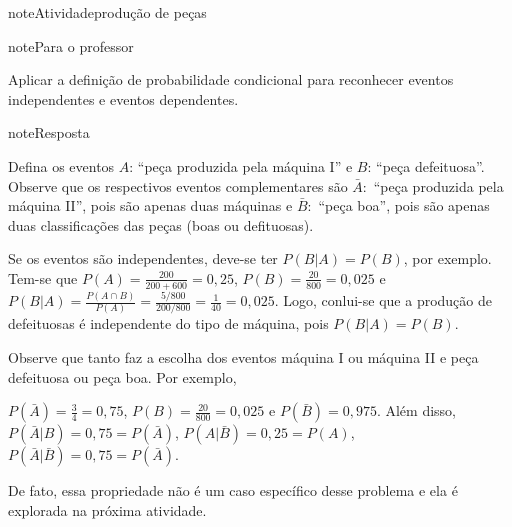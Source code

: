 \begin{sphinxadmonition}{note}{Atividade}{produção de peças}
\label{ativ-producao-de-pecas}

\begin{sphinxadmonition}{note}{Para o professor}

 Aplicar a definição de probabilidade condicional para reconhecer eventos independentes e eventos dependentes.

\begin{sphinxadmonition}{note}{Resposta}

Defina os eventos \(A\):  “peça produzida pela máquina I” e \(B\): “peça defeituosa”. Observe que os respectivos eventos complementares são \(\bar{A}:\) “peça produzida pela máquina II”, pois são apenas duas máquinas e \(\bar{B}:\) “peça boa”, pois são apenas duas classificações das peças (boas ou defituosas).

Se os eventos são independentes, deve-se ter \(P(B|A)=P(B)\), por exemplo. Tem-se que \(P(A)=\frac{200}{200+600}=0,25\), \(P(B)=\frac{20}{800}=0,025\) e \(P(B|A)=\frac{P(A\cap B)}{P(A)}=\frac{5/800}{200/800}=\frac{1}{40}=0,025\). Logo, conlui-se que a produção de defeituosas é independente do tipo de máquina, pois \(P(B|A)=P(B)\).

Observe que tanto faz a escolha dos eventos máquina I ou máquina II e peça defeituosa ou peça boa. Por exemplo,

\(P(\bar{A})=\frac{3}{4}=0,75\), \(P(B)=\frac{20}{800}=0,025\) e \(P(\bar{B})=0,975\).
Além disso, \(P(\bar{A}|B)=0,75=P(\bar{A})\), \(P(A|\bar{B})=0,25=P(A)\), \(P(\bar{A}|\bar{B})=0,75=P(\bar{A})\).

De fato, essa propriedade não é um caso específico desse problema e ela é explorada na próxima atividade.
\end{sphinxadmonition}
\end{sphinxadmonition}
\label{\detokenize{PE511-8:id1}}
\begin{figure}[H]
\centering

\noindent{}
\label{\detokenize{PE511-8:id1}}\end{figure}
\end{sphinxadmonition}

